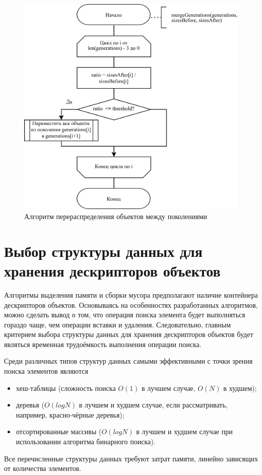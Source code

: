 \begin{figure}[H]
	\centering
	\includegraphics[scale=0.185]{assets/relocate.png}
	\caption{Алгоритм перераспределения объектов между поколениями}
	\label{fig:relocate}
\end{figure}




\section*{Выбор структуры данных для хранения дескрипторов объектов}

Алгоритмы выделения памяти и сборки мусора предполагают наличие контейнера дескрипторов объектов. Основываясь на особенностях разработанных алгоритмов, можно сделать вывод о том, что операция поиска элемента будет выполняться гораздо чаще, чем операции вставки и удаления. Следовательно, главным критерием выбора структуры данных для хранения дескрипторов объектов будет являться временная трудоёмкость выполнения операции поиска.

Среди различных типов структур данных самыми эффективными с точки зрения поиска элементов являются
\begin{itemize}[label*=---]
	\item хеш-таблицы (сложность поиска $O(1)$ в лучшем случае, $O(N)$ в худшем);
	\item деревья ($O(log N)$ в лучшем и худшем случае, если рассматривать, например, красно-чёрные деревья);
	\item отсортированные массивы ($O(log N)$ в лучшем и худшем случае при использовании алгоритма бинарного поиска).
\end{itemize}
Все перечисленные структуры данных требуют затрат памяти, линейно зависящих от количества элементов.

